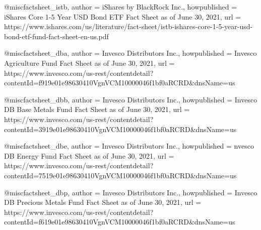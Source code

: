@misc{factsheet_istb,
  author        = {iShares by BlackRock Inc.},
  howpublished  = {iShares Core 1-5 Year USD Bond ETF Fact Sheet as of June 30, 2021},
  url           = {https://www.ishares.com/us/literature/fact-sheet/istb-ishares-core-1-5-year-usd-bond-etf-fund-fact-sheet-en-us.pdf}
}

@misc{factsheet_dba,
  author        = {Invesco Distributors Inc.},
  howpublished  = {Invesco Agriculture Fund Fact Sheet as of June 30, 2021},
  url           = {https://www.invesco.com/us-rest/contentdetail?contentId=f919e01e98630410VgnVCM10000046f1bf0aRCRD&dnsName=us}
}

@misc{factsheet_dbb,
  author        = {Invesco Distributors Inc.},
  howpublished  = {Invesco DB Base Metals Fund Fact Sheet as of June 30, 2021},
  url           = {https://www.invesco.com/us-rest/contentdetail?contentId=3919e01e98630410VgnVCM10000046f1bf0aRCRD&dnsName=us}
}

@misc{factsheet_dbe,
  author        = {Invesco Distributors Inc.},
  howpublished  = {nvesco DB Energy Fund Fact Sheet as of June 30, 2021},
  url           = {https://www.invesco.com/us-rest/contentdetail?contentId=7519e01e98630410VgnVCM10000046f1bf0aRCRD&dnsName=us}
}

@misc{factsheet_dbp,
  author        = {Invesco Distributors Inc.},
  howpublished  = {Invesco DB Precious Metals Fund Fact Sheet as of June 30, 2021},
  url           = {https://www.invesco.com/us-rest/contentdetail?contentId=f619e01e98630410VgnVCM10000046f1bf0aRCRD&dnsName=us}
}